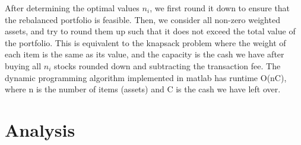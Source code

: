 \documentclass[english]{scrartcl}
\begin{document}
		 After determining the optimal values $n_{i}$, we first round it down to ensure that the rebalanced portfolio is feasible. Then, we consider all non-zero weighted assets, and try to round them up such that it does not exceed the total value of the portfolio. This is equivalent to the knapsack problem where the weight of each item is the same as its value, and the capacity is the cash we have after buying all $n_{i}$ stocks rounded down and subtracting the transaction fee. The dynamic programming algorithm implemented in matlab has runtime O(nC), where n is the number of items (assets) and C is the cash we have left over. 
		 
	\section{Analysis}
	
\end{document}
